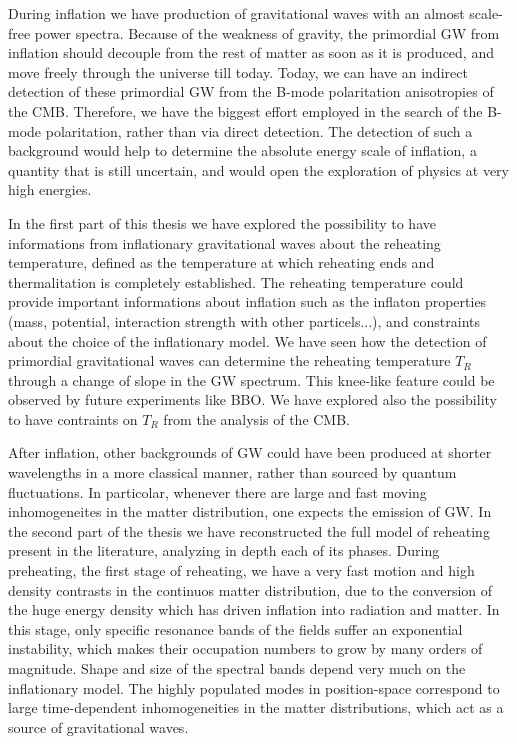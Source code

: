 \documentclass[11pt,a4paper,twoside]{book}
\begin{document}
During inflation we have production of gravitational waves with an almost scale-free power spectra. Because of the weakness of gravity, the primordial GW from inflation should decouple from the rest of matter as soon as it is produced, and move freely through the universe till today. Today, we can have an indirect detection of these primordial GW from the B-mode polaritation anisotropies of the CMB. Therefore, we have the biggest effort employed in the search of the B-mode polaritation, rather than via direct detection. The detection of such a background would help to determine the absolute energy scale of inflation, a quantity that is still uncertain, and would open the exploration of physics at very high energies.

In the first part of this thesis we have explored the possibility to have informations from inflationary gravitational waves about the reheating temperature, defined as the temperature at which reheating ends and thermalitation is completely established. The reheating temperature could provide important informations about inflation such as the inflaton properties (mass, potential, interaction strength with other particels...), and constraints about the choice of the inflationary model. We have seen how the detection of primordial gravitational waves can determine the reheating temperature $ T_{R} $ through a change of slope in the GW spectrum. This knee-like feature could be observed by future experiments like BBO. We have explored also the possibility to have contraints on $ T_{R} $ from the analysis of the CMB.

After inflation, other backgrounds of GW could have been produced at shorter wavelengths in a more classical manner, rather than sourced by quantum fluctuations. In particolar, whenever there are large and fast moving inhomogeneites in the matter distribution, one expects the emission of GW. In the second part of the thesis we have reconstructed the full model of reheating present in the literature, analyzing in depth each of its phases. During preheating, the first stage of reheating, we have a very fast motion and high density contrasts in the continuos matter distribution, due to the conversion of the huge energy density which has driven inflation into radiation and matter. In this stage, only specific resonance bands of the fields suffer an exponential instability, which makes their occupation numbers to  grow by many orders of magnitude. Shape and size of the spectral bands depend very much on the inflationary model. The highly populated modes in position-space correspond to large time-dependent inhomogeneities in the matter distributions, which act as a source  of gravitational waves.
\end{document}
